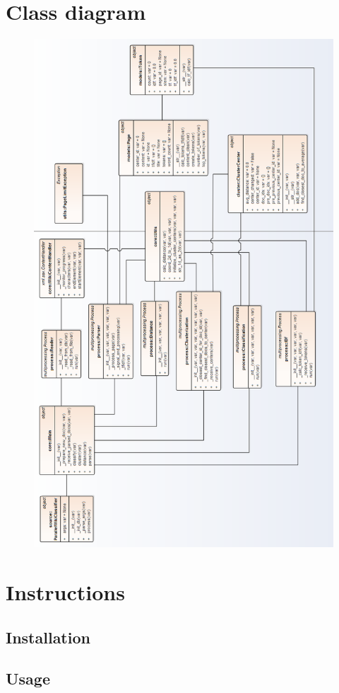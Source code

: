 \appendix
\chapter{Class diagram} \label{appendix-class}
\begin{figure}[h]
	\begin{center}
		\includegraphics[width=1.0\linewidth]{images/diagrams/class-horizontal.png}
		\label{appendix-class-diagram}
	\end{center}
\end{figure}


\chapter{Instructions}
\section{Installation}
\section{Usage}
